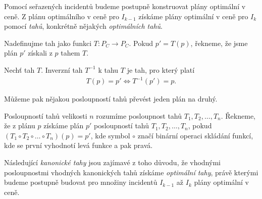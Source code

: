 Pomocí seřazených incidentů budeme postupně konstruovat plány optimální v ceně.
Z plánu optimálního v ceně pro $I_{k-1}$ získáme plány optimální v ceně pro $I_k$ pomocí \textit{tahů}, konkrétně nějakých \textit{optimálních tahů}.
\begin{definice}[Tah]\label{df:tah}
  Nadefinujme tah jako funkci $T \colon P_C \rightarrow P_C$.
  Pokud $p' = T(p)$, řekneme, že jsme plán $p'$ získali z $p$ tahem $T$.
\end{definice}

\begin{definice}\label{df:tah}
  Nechť tah $T$. Inverzní tah $T^{-1}$ k tahu $T$ je tah, pro který platí
  \begin{align*}
    T(p) = p' \Leftrightarrow T^{-1}(p') = p.
  \end{align*}
\end{definice}

Můžeme pak nějakou posloupností tahů převést jeden plán na druhý.
\begin{definice}
  Posloupností tahů velikosti $n$ rozumíme posloupnost tahů $T_1, T_2, \dots, T_n$.
  Řekneme, že z plánu $p$ získáme plán $p'$ posloupností tahů $T_1, T_2, \dots, T_n$,
  pokud $(T_1 \circ T_2 \circ \dots \circ T_n)(p) = p'$, kde symbol $\circ$ značí binární operaci skládání funkcí,
  kde se první vyhodnotí levá funkce a pak pravá.
\end{definice}

Následující \textit{kanonické tahy} jsou zajímavé z toho důvodu, že vhodnými posloupnostmi vhodných kanonických tahů získáme \textit{optimální tahy},
právě kterými budeme postupně budovat pro množiny incidentů $I_{k-1}$ až $I_k$ plány optimální v ceně. 

